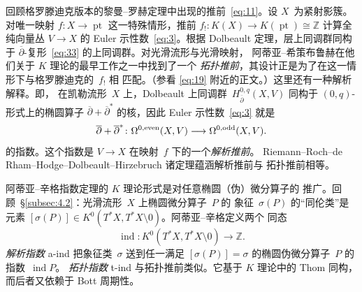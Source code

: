 \documentclass[11pt]{amsart}
\theoremstyle{definition}
\theoremstyle{remark}
\theoremstyle{plain}
\numberwithin{equation}{section}
\renewcommand{\:}{\colon}
\DeclareMathOperator{\pt}{pt}
\newcommand{\ZZ}{{\mathbb Z}}
\newcommand{\dbar}{{\overline\partial}}
\DeclareMathOperator{\ind}{ind}
\DeclareMathOperator{\Ell}{Ell}
\begin{document}
回顾格罗滕迪克版本的黎曼–罗赫定理中出现的推前~\eqref{eq:11}。设
$X$~为紧射影簇。对唯一映射 $f\:X\to\pt$ 这一特殊情形，推前
$f_!\:K(X)\to K(\pt)\cong \ZZ$ 计算全纯向量丛 $V\to X$ 的 Euler
示性数~\eqref{eq:3}。根据 Dolbeault 定理，层上同调群同构于
$\dbar$-复形~\eqref{eq:33} 的上同调群。对光滑流形与光滑映射，
阿蒂亚–希策布鲁赫在他们关于 $K$ 理论的最早工作之一中找到了一个
\emph{拓扑推前}，其设计正是为了在这一情形下与格罗滕迪克的~$f_!$ 相
匹配。（参看 \eqref{eq:19} 附近的正文。）这里还有一种解析解释。即，
在凯勒流形~$X$ 上，Dolbeault 上同调群~$H^{0,q}_{\dbar}(X,V)$
同构于 $(0,q)$-形式上的椭圆算子 $\dbar + \dbar^*$ 的核，因此 Euler
示性数~\eqref{eq:3} 就是
  \begin{equation}\label{eq:48}
     \dbar+\dbar^*\:\Omega ^{0,\textnormal{even}}(X,V) \longrightarrow \Omega
     ^{0,\textnormal{odd}}(X,V). 
  \end{equation}
的指数。这个指数是 $V\to X$ 在映射~$f$ 下的一个\emph{解析推前}。
Riemann–Roch–de Rham–Hodge–Dolbeault–Hirzebruch 诸定理蕴涵解析推前与
拓扑推前相等。


阿蒂亚–辛格指数定理的 $K$ 理论形式是对任意椭圆（伪）微分算子的
推广。回顾~\S\ref{subsec:4.2}：光滑流形~$X$ 上椭圆微分算子~$P$ 的
象征~$\sigma (P)$ 的“同伦类”是元素
$[\sigma (P)]\in K^0(T^*X, T^*X\setminus 0)$。阿蒂亚–辛格定义两个
同态
  \begin{equation}\label{eq:49}
     \ind\:K^0(T^*X, T^*X\setminus 0)\longrightarrow \ZZ. 
  \end{equation}
\emph{解析指数} a-ind 把象征类~$\sigma $ 送到任一满足
$[\sigma (P)]=\sigma $ 的椭圆伪微分算子~$P$ 的指数~$\ind P$。
\emph{拓扑指数} t-ind 与拓扑推前类似。它基于 $K$ 理论中的 Thom
同构，而后者又依赖于 Bott 周期性。

\end{document}
